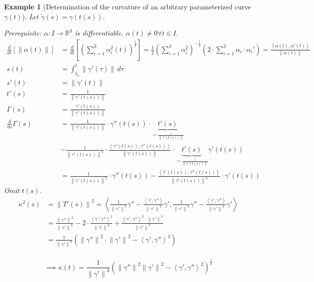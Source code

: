 \documentclass{article}
\newtheorem{example}{Example}  \numberwithin{example}{section}
\newcommand{\angel}[1]{\left\langle#1\right\rangle}
\newcommand{\norm}[1]{\left\|#1\right\|}
\begin{document}
\begin{example}[Determination of the curvature of an arbitrary parameterized curve $\gamma(t)$]
  Let $\tilde\gamma(s) = \gamma(t(s))$.

  Prerequisite: $\alpha: I \to \mathbb R^3$ is differentiable.
  $\alpha(t) \neq 0 \forall t \in I$.
  \begin{align*}
    \frac{d}{dt} \left[\norm{\alpha(t)}\right] &= \frac{d}{dt} \left[\left(\sum_{i=1}^3 \alpha_i^2(t)\right)^{\frac12}\right]
      = \frac12 \left(\sum_{i=1}^3 \alpha_i^2\right)^{-\frac12} \left(2 \cdot \sum_{i=1}^3 \alpha_i \cdot \alpha_i'\right)
      = \frac{\angel{\alpha(t), \alpha'(t)}}{\norm{\alpha(t)}} \\
    s(t) &= \int_{t_0}^t \norm{\gamma'(\tau)} \, d\tau \\
    s'(t) &= \norm{\gamma'(t)} \\
    t'(s) &= \frac{1}{\norm{\gamma'(t(s))}} \\
    \Gamma(s) &= \frac{\gamma'(t(s))}{\norm{\gamma'(t(s))}} \\
    \frac{d}{ds} \Gamma(s) &= \frac{1}{\norm{\gamma'(t(s))}} \cdot \gamma''(t(s)) \cdot \underbrace{t'(s)}_{= \frac{1}{\norm{\gamma'(t(s))}}} \\
      &- \frac{1}{\norm{\gamma'(t(s))}^2} \cdot \frac{\angel{\gamma'(t(s)), \gamma''(t(s))}}{\norm{\gamma'(t(s))}} \cdot \underbrace{t'(s)}_{= \frac{1}{\norm{\gamma'(t(s))}}} \gamma'(t(s)) \\
      &= \frac{1}{\norm{\gamma'(t(s))}^2} \cdot \gamma''(t(s)) - \frac{\angel{\gamma'(t(s)), \gamma''(t(s))}}{\norm{\gamma'(t(s))}^4} \cdot \gamma'(t(s))
  \end{align*}
  Omit $t(s)$.
  \begin{align*}
    \kappa^2(s) &= \norm{T'(s)}^2 = \angel{
                    \frac{1}{\norm{\gamma'}^2} \gamma'' - \frac{\angel{\gamma', \gamma''}}{\norm{\gamma'}^4} \gamma',
                    \frac{1}{\norm{\gamma'}^2} \gamma'' - \frac{\angel{\gamma', \gamma''}}{\norm{\gamma'}^4} \gamma'
                   } \\
                &= \frac{\norm{\gamma''}^2}{\norm{\gamma'}^4} - 2 \cdot \frac{\angel{\gamma', \gamma''}^2}{\norm{\gamma'}^6} + \frac{\angel{\gamma', \gamma''}^2 \cdot \norm{\gamma'}^2}{\norm{\gamma'}^8} \\
                &= \frac{1}{\norm{\gamma'}^6} \left(\norm{\gamma''}^2 \cdot \norm{\gamma'}^2 - \angel{\gamma', \gamma''}^2\right) \\
  \end{align*}
  \begin{mdframed}
    \[ \implies \kappa(t) = \frac{1}{\norm{\gamma'}^3} \left(\norm{\gamma''}^2 \norm{\gamma'}^2 - \angel{\gamma', \gamma''}^2\right)^{\frac12} \]
  \end{mdframed}
\end{example}
\end{document}

